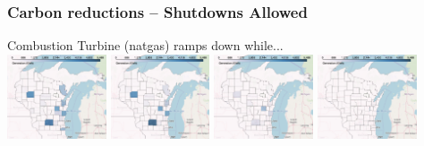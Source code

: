 \documentclass[xcolor=dvipsnames]{beamer}
\begin{document}
\begin{frame}
  \frametitle{Carbon reductions -- Shutdowns Allowed}
  Combustion Turbine (natgas) ramps down while... \\
  \includegraphics[width=0.22\textwidth]{includes/no_leakage_shutdowns_CT_r0.png}
  \includegraphics[width=0.22\textwidth]{includes/no_leakage_shutdowns_CT_r2.png}
  \includegraphics[width=0.22\textwidth]{includes/no_leakage_shutdowns_CT_r3.png}
  \includegraphics[width=0.22\textwidth]{includes/no_leakage_shutdowns_CT_r4.png}


\end{frame}
\end{document}
